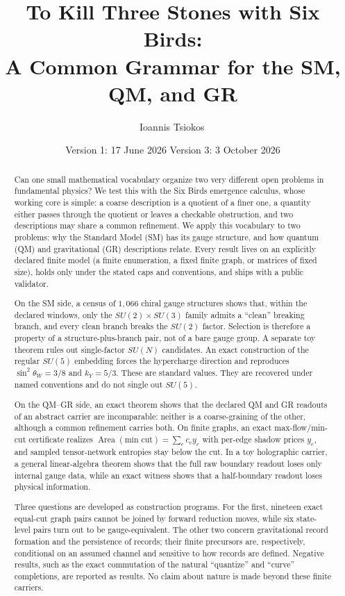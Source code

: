 \documentclass[11pt]{article}
\title{To Kill Three Stones with Six Birds:\\ A Common Grammar for the SM, QM, and GR}
\author{Ioannis Tsiokos\,\orcidlink{0009-0009-7659-5964}}
\date{Version 1: 17 June 2026 \quad\textperiodcentered\quad Version 3: 3 October 2026}
\theoremstyle{definition}
\begin{document}
\maketitle
\thispagestyle{firstpage}

\begin{abstract}
Can one small mathematical vocabulary organize two very different open problems in fundamental physics? We test
this with the Six Birds emergence calculus, whose working core is simple: a coarse description is a quotient of a finer
one, a quantity either passes through the quotient or leaves a checkable obstruction, and two descriptions may
share a common refinement. We apply this vocabulary to two problems: why the Standard Model (SM) has its gauge
structure, and how quantum (QM) and gravitational (GR) descriptions relate. Every result lives on an explicitly declared
finite model (a finite enumeration, a fixed finite graph, or matrices of fixed size), holds only under the stated
caps and conventions, and ships with a public validator.

On the SM side, a census of \(1{,}066\) chiral gauge structures shows that, within the declared windows, only the
\(SU(2)\times SU(3)\) family admits a ``clean'' breaking branch, and every clean branch breaks the \(SU(2)\) factor.
Selection is therefore a property of a structure-plus-branch pair, not of a bare gauge group. A separate toy theorem
rules out single-factor \(SU(N)\) candidates. An exact construction of the regular \(SU(5)\) embedding forces the
hypercharge direction and reproduces \(\sin^2\theta_W=3/8\) and \(k_Y=5/3\). These are standard values. They are
recovered under named conventions and do not single out \(SU(5)\).

On the QM--GR side, an exact theorem shows that the declared QM and GR readouts of an abstract carrier are
incomparable: neither is a coarse-graining of the other, although a common refinement carries both. On finite graphs,
an exact max-flow/min-cut certificate realizes \(\operatorname{Area}(\text{min cut})=\sum_e c_e y_e\) with per-edge
shadow prices \(y_e\), and sampled tensor-network entropies stay below the cut. In a toy holographic carrier, a general
linear-algebra theorem shows that the full raw boundary readout loses only internal gauge data, while an exact witness
shows that a half-boundary readout loses physical information.

Three questions are developed as construction programs. For the first, nineteen exact equal-cut graph pairs cannot be
joined by forward reduction moves, while six state-level pairs turn out to be gauge-equivalent. The other two concern
gravitational record formation and the persistence of records; their finite precursors are, respectively, conditional
on an assumed channel and sensitive to how records are defined. Negative results, such as the exact commutation of
the natural ``quantize'' and ``curve'' completions, are reported as results. No claim about nature is made beyond these
finite carriers.
\end{abstract}
\end{document}
